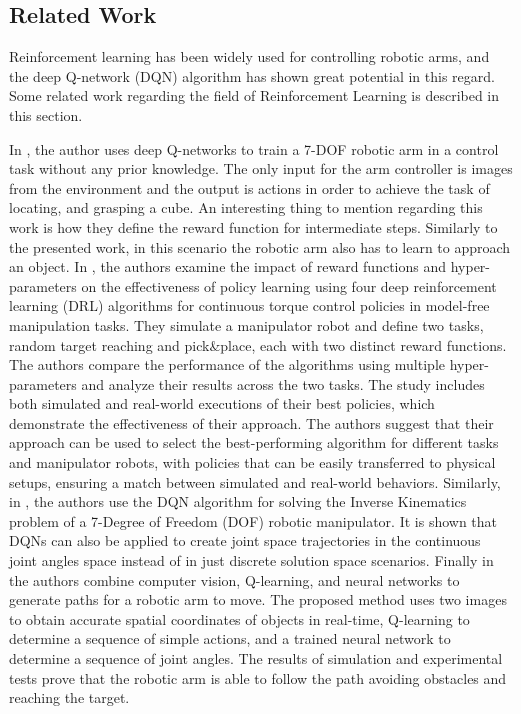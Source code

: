 \documentclass[12pt,oneside]{article}
\begin{document}
%
\subsection{Related Work}
Reinforcement learning has been widely used for controlling robotic arms, and the deep Q-network (DQN) algorithm has shown great potential in this regard. Some related work regarding the field of Reinforcement Learning is described in this section.

In \cite{james20163d}, the author uses deep Q-networks to train a 7-DOF robotic arm in
a control task without any prior knowledge. The only input for the arm controller is images from the environment and the output is actions in order to achieve the task of locating, and grasping a cube. An interesting thing to mention regarding this work is how they define the reward function for intermediate steps. Similarly to the presented work, in this scenario the robotic arm also has to learn to approach an object. 
In \cite{franceschetti2022robotic}, the authors examine the impact of reward functions and hyper-parameters on the effectiveness of policy learning using four deep reinforcement learning (DRL) algorithms for continuous torque control policies in model-free manipulation tasks. They simulate a manipulator robot and define two tasks, random target reaching and pick\&place, each with two distinct reward functions. The authors compare the performance of the algorithms using multiple hyper-parameters and analyze their results across the two tasks. The study includes both simulated and real-world executions of their best policies, which demonstrate the effectiveness of their approach. The authors suggest that their approach can be used to select the best-performing algorithm for different tasks and manipulator robots, with policies that can be easily transferred to physical setups, ensuring a match between simulated and real-world behaviors.
Similarly,  in \cite{malik2022deep}, the authors use the DQN algorithm for solving the Inverse Kinematics problem of a 7-Degree of Freedom (DOF) robotic manipulator. It is shown that DQNs can also be applied to create joint space trajectories in the continuous joint angles space instead of in just discrete solution space scenarios.
Finally in \cite{abdi2022computer} the authors combine computer vision, Q-learning, and neural networks to generate paths for a robotic arm to move. The proposed method uses two images to obtain accurate spatial coordinates of objects in real-time, Q-learning to determine a sequence of simple actions, and a trained neural network to determine a sequence of joint angles. The results of simulation and experimental tests prove that the robotic arm is able to follow the path avoiding obstacles and reaching the target.
\end{document}
